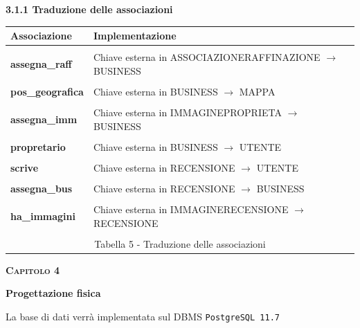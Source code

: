 \documentclass[a4paper,12pt]{article}
\begin{document}
\newpage\null{}\setcounter{page}{13}
\vspace{-2cm}
\begin{flushleft}
{\bf 3.1.1 Traduzione delle associazioni} 
\vspace{+1cm}

\begin{table}[htbp]
\begin{tabular}[c]{ p{3.5cm}  p{11.5cm} }
\hline
\bf Associazione&\bf Implementazione\\
\hline\\
{\bf assegna\_raff}
&\small Chiave esterna in ASSOCIAZIONERAFFINAZIONE $\rightarrow$ BUSINESS
\\
\\
{\bf pos\_geografica}
&\small Chiave esterna in BUSINESS $\rightarrow$ MAPPA
\\
\\
{\bf assegna\_imm}
&\small Chiave esterna in IMMAGINEPROPRIETA $\rightarrow$ BUSINESS
\\
\\
{\bf propretario}
&\small Chiave esterna in BUSINESS $\rightarrow$ UTENTE
\\
\\
{\bf scrive}
&\small Chiave esterna in RECENSIONE $\rightarrow$ UTENTE
\\
\\
{\bf assegna\_bus}
&\small Chiave esterna in RECENSIONE $\rightarrow$ BUSINESS
\\
\\
{\bf ha\_immagini}
&\small Chiave esterna in IMMAGINERECENSIONE $\rightarrow$ RECENSIONE
\\\\
\hline
\multicolumn{2}{c}{\footnotesize{\normalsize Tabella 5 - Traduzione
delle associazioni}}
\end{tabular}
\end{table}
\end{flushleft}
\newpage

\newpage\null{}\setcounter{page}{14}
\begin{flushleft}
\vspace*{+1cm}
\Large\textsc{\bf Capitolo 4}
\vspace*{+1cm}

\begingroup
\fontsize{30pt}{12pt}\selectfont\bf{Progettazione fisica}
\endgroup

\vspace*{+1cm}
\normalsize{
La base di dati verrà implementata sul DBMS \verb|PostgreSQL 11.7|
}
\end{flushleft}
\end{document}
